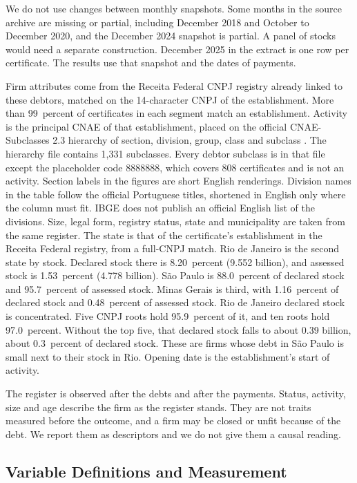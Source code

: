 We do not use changes between monthly snapshots.
Some months in the source archive are missing or partial, including December 2018 and October to December 2020, and the December 2024 snapshot is partial.
A panel of stocks would need a separate construction.
December 2025 in the extract is one row per certificate.
The results use that snapshot and the dates of payments.

Firm attributes come from the Receita Federal CNPJ registry already linked to these debtors, matched on the 14-character CNPJ of the establishment.
More than 99~percent of certificates in each segment match an establishment.
Activity is the principal CNAE of that establishment, placed on the official CNAE-Subclasses 2.3 hierarchy of section, division, group, class and subclass \citep{ibge2019cnae}.
The hierarchy file contains 1,331 subclasses.
Every debtor subclass is in that file except the placeholder code 8888888, which covers 808 certificates and is not an activity.
Section labels in the figures are short English renderings.
Division names in the table follow the official Portuguese titles, shortened in English only where the column must fit.
IBGE does not publish an official English list of the divisions.
Size, legal form, registry status, state and municipality are taken from the same register.
The state is that of the certificate's establishment in the Receita Federal registry, from a full-CNPJ match.
Rio de Janeiro is the second state by stock.
Declared stock there is 8.20~percent (\brl{}9.552 billion), and assessed stock is 1.53~percent (\brl{}4.778 billion).
S\~ao Paulo is 88.0~percent of declared stock and 95.7~percent of assessed stock.
Minas Gerais is third, with 1.16~percent of declared stock and 0.48~percent of assessed stock.
Rio de Janeiro declared stock is concentrated.
Five CNPJ roots hold 95.9~percent of it, and ten roots hold 97.0~percent.
Without the top five, that declared stock falls to about \brl{}0.39 billion, about 0.3~percent of declared stock.
These are firms whose debt in S\~ao Paulo is small next to their stock in Rio.
Opening date is the establishment's start of activity.

The register is observed after the debts and after the payments.
Status, activity, size and age describe the firm as the register stands.
They are not traits measured before the outcome, and a firm may be closed or unfit because of the debt.
We report them as descriptors and we do not give them a causal reading.

\subsection{Variable Definitions and Measurement}\label{sec:measures}

